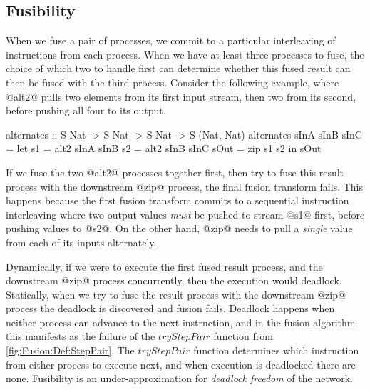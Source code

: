 \subsection{Fusibility}
\label{s:FusionOrder}
When we fuse a pair of processes, we commit to a particular interleaving of instructions from each process.
When we have at least three processes to fuse, the choice of which two to handle first can determine whether this fused result can then be fused with the third process.
Consider the following example, where @alt2@ pulls two elements from its first input stream, then two from its second, before pushing all four to its output.
\begin{haskell}
alternates :: S Nat -> S Nat -> S Nat -> S (Nat, Nat)
alternates sInA sInB sInC
 = let  s1   = alt2 sInA sInB
        s2   = alt2 sInB sInC
        sOut = zip s1 s2
   in   sOut
\end{haskell}
If we fuse the two @alt2@ processes together first, then try to fuse this result process with the downstream @zip@ process, the final fusion transform fails. This happens because the first fusion transform commits to a sequential instruction interleaving where two output values \emph{must} be pushed to stream @s1@ first, before pushing values to @s2@. On the other hand, @zip@ needs to pull a \emph{single} value from each of its inputs alternately.

Dynamically, if we were to execute the first fused result process, and the downstream @zip@ process concurrently, then the execution would deadlock. Statically, when we try to fuse the result process with the downstream @zip@ process the deadlock is discovered and fusion fails. Deadlock happens when neither process can advance to the next instruction, and in the fusion algorithm this manifests as the failure of the $tryStepPair$ function from \autoref{fig:Fusion:Def:StepPair}. The $tryStepPair$ function determines which instruction from either process to execute next, and when execution is deadlocked there are none. Fusibility is an under-approximation for \emph{deadlock freedom} of the network.



